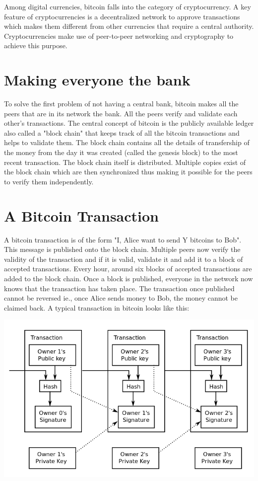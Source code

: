 Among digital currencies, bitcoin falls into the category of cryptocurrency. A key feature of cryptocurrencies is a decentralized network to approve transactions which makes them different from other currencies that require a central authority. Cryptocurrencies make use of peer-to-peer networking and cryptography to achieve this purpose.

\section{Making everyone the bank}
To solve the first problem of not having a central bank, bitcoin makes all the peers that are in its network the bank. All the peers verify and validate each other's transactions. The central concept of bitcoin is the publicly available ledger also called a "block chain" that keeps track of all the bitcoin transactions and helps to validate them. The block chain contains all the details of transfership of the money from the day it was created (called the genesis block) to the most recent transaction. The block chain itself is distributed. Multiple copies exist of the block chain which are then synchronized thus making it possible for the peers to verify them independently.

\section{A Bitcoin Transaction}
A bitcoin transaction is of the form "I, Alice want to send Y bitcoins to Bob". This message is published onto the block chain. Multiple peers now verify the validity of the transaction and if it is valid, validate it and add it to a block of accepted transactions. Every hour, around six blocks of accepted transactions are added to the block chain. Once a block is published, everyone in the network now knows that the transaction has taken place. The transaction once published cannot be reversed ie., once Alice sends money to Bob, the money cannot be claimed back. A typical transaction in bitcoin looks like this:

\includegraphics[scale=0.5]{images/transaction.png}

